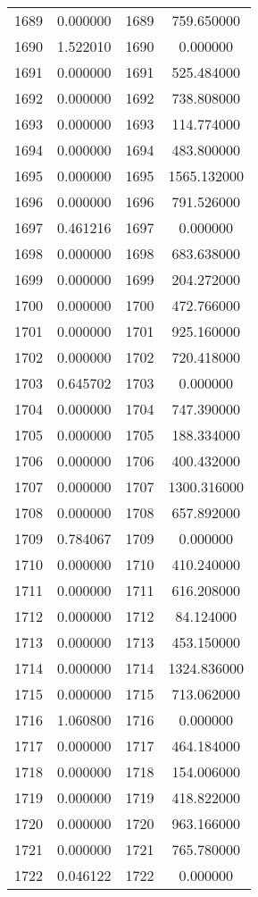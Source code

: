 \documentclass[12pt]{article}
\begin{document}
\begin{longtable}{@{}cccc@{}}
1689 & 0.000000 & 1689 & 759.650000 \\
1690 & 1.522010 & 1690 & 0.000000 \\
1691 & 0.000000 & 1691 & 525.484000 \\
1692 & 0.000000 & 1692 & 738.808000 \\
1693 & 0.000000 & 1693 & 114.774000 \\
1694 & 0.000000 & 1694 & 483.800000 \\
1695 & 0.000000 & 1695 & 1565.132000 \\
1696 & 0.000000 & 1696 & 791.526000 \\
1697 & 0.461216 & 1697 & 0.000000 \\
1698 & 0.000000 & 1698 & 683.638000 \\
1699 & 0.000000 & 1699 & 204.272000 \\
1700 & 0.000000 & 1700 & 472.766000 \\
1701 & 0.000000 & 1701 & 925.160000 \\
1702 & 0.000000 & 1702 & 720.418000 \\
1703 & 0.645702 & 1703 & 0.000000 \\
1704 & 0.000000 & 1704 & 747.390000 \\
1705 & 0.000000 & 1705 & 188.334000 \\
1706 & 0.000000 & 1706 & 400.432000 \\
1707 & 0.000000 & 1707 & 1300.316000 \\
1708 & 0.000000 & 1708 & 657.892000 \\
1709 & 0.784067 & 1709 & 0.000000 \\
1710 & 0.000000 & 1710 & 410.240000 \\
1711 & 0.000000 & 1711 & 616.208000 \\
1712 & 0.000000 & 1712 & 84.124000 \\
1713 & 0.000000 & 1713 & 453.150000 \\
1714 & 0.000000 & 1714 & 1324.836000 \\
1715 & 0.000000 & 1715 & 713.062000 \\
1716 & 1.060800 & 1716 & 0.000000 \\
1717 & 0.000000 & 1717 & 464.184000 \\
1718 & 0.000000 & 1718 & 154.006000 \\
1719 & 0.000000 & 1719 & 418.822000 \\
1720 & 0.000000 & 1720 & 963.166000 \\
1721 & 0.000000 & 1721 & 765.780000 \\
1722 & 0.046122 & 1722 & 0.000000 \\

\end{longtable}
\end{document}
